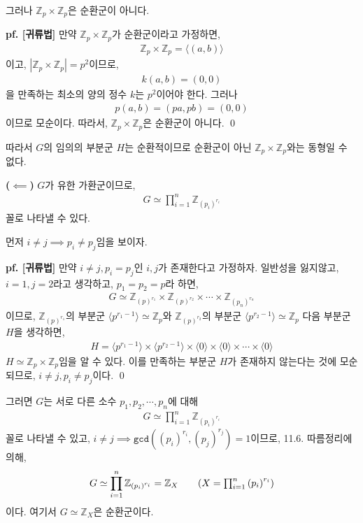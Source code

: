 \documentclass{article}
\begin{document}
그러나 $\mathbb{Z}_p \times \mathbb{Z}_p$은 순환군이 아니다.

\textbf{pf. [귀류법]} 만약 $\mathbb{Z}_p \times \mathbb{Z}_p$가 순환군이라고 가정하면,
\begin{align*}
\mathbb{Z}_p \times \mathbb{Z}_p = \langle (a, b) \rangle
\end{align*}이고, $\left|\mathbb{Z}_p \times \mathbb{Z}_p\right| = p^2$이므로,
\begin{align*}
k(a, b) = (0, 0)
\end{align*}을 만족하는 최소의 양의 정수 $k$는 $p^2$이어야 한다. 그러나
\begin{align*}
p(a, b) = (pa, pb) = (0, 0)
\end{align*}이므로 모순이다. 따라서, $\mathbb{Z}_p \times \mathbb{Z}_p$은 순환군이 아니다. \qed

따라서 $G$의 임의의 부분군 $H$는 순환적이므로 순환군이 아닌 $\mathbb{Z}_p \times \mathbb{Z}_p$와는 동형일 수 없다.

\textbf{($\impliedby$)} $G$가 유한 가환군이므로,
\begin{align*}
G \simeq \prod_{i=1}^{n}\mathbb{Z}_{ \left(p_i\right)^{r_i}} \tag{$p_i$는 소수, $r_i$는 양의 정수}
\end{align*}꼴로 나타낼 수 있다. 

먼저 $i \neq j \implies p_i \neq p_j$임을 보이자.

\textbf{pf. [귀류법]} 만약 $i \neq j, p_i = p_j$인 $i, j$가 존재한다고 가정하자. 일반성을 잃지않고, $i=1, j=2$라고 생각하고, $p_1 = p_2 = p$라 하면,
\begin{align}
G \simeq \mathbb{Z}_{ \left(p\right)^{r_1}} \times \mathbb{Z}_{ \left(p\right)^{r_2}} \times \cdots \times \mathbb{Z}_{ \left(p_n\right)^{r_n}}
\end{align}이므로, $\mathbb{Z}_{ \left(p\right)^{r_1}}$의 부분군 $\langle p^{r_1 - 1} \rangle \simeq \mathbb{Z}_p$와 $\mathbb{Z}_{ \left(p\right)^{r_2}}$의 부분군 $\langle p^{r_2 - 1} \rangle \simeq \mathbb{Z}_p$   다음 부분군 $H$을 생각하면, 
\begin{align*}
H = \langle p^{r_1 - 1} \rangle \times \langle p^{r_2 - 1} \rangle \times \langle 0 \rangle \times \langle 0 \rangle \times \cdots \times \langle 0 \rangle
\end{align*} $H \simeq \mathbb{Z}_p \times \mathbb{Z}_p$임을 알 수 있다. 이를 만족하는 부분군 $H$가 존재하지 않는다는 것에 모순되므로, $i \neq j, p_i\neq p_j$이다.  \qed

그러면 $G$는 서로 다른 소수 $p_1, p_2, \cdots, p_n$에 대해
\begin{align*}
G \simeq \prod_{i=1}^{n}\mathbb{Z}_{ \left(p_i\right)^{r_i}} \tag{$r_i$는 양의 정수}
\end{align*}꼴로 나타낼 수 있고, $i \neq j \implies \texttt{gcd}((p_i)^{r_i}, (p_j)^{r_j}) = 1$이므로, 11.6. 따름정리에의해,
\begin{align*}
G \simeq \prod_{i=1}^{n}\mathbb{Z}_{ \left(p_i\right)^{r_i}} = \mathbb{Z}_{X} \tag{$X = {\prod_{i=1}^{n}\left(p_i\right)^{r_i}}$}
\end{align*}이다. 여기서 $G \simeq \mathbb{Z}_X$은 순환군이다.
\end{document}
